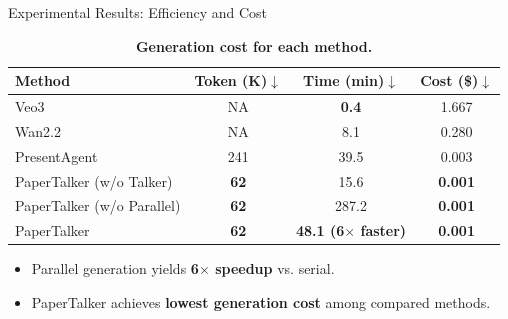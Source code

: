 \documentclass{beamer}
\newcommand{\alertterm}[1]{\alert{\textbf{#1}}}
\begin{document}
\begin{frame}{Experimental Results: Efficiency and Cost}
\begin{table}[ht]
  \centering
  \small
  \caption{\textbf{Generation cost for each method.}}
  \label{table:cost}
  \setlength{\tabcolsep}{6pt}
  \begin{tabular}{lccc}
    \toprule
    Method & Token (K)$\downarrow$ & Time (min)$\downarrow$ & Cost (\$)$\downarrow$ \\
    \midrule
    Veo3~\cite{deepmind2025veo3} & NA & \textbf{0.4} & 1.667 \\
    Wan2.2~\cite{wan} & NA & 8.1 & 0.280 \\
    \midrule
    PresentAgent~\cite{shi2025presentagent} & 241 & 39.5 & 0.003 \\
    PaperTalker (w/o Talker) & \textbf{62} & 15.6 & \textbf{0.001} \\
    PaperTalker (w/o Parallel) & \textbf{62} & 287.2 & \textbf{0.001} \\
    PaperTalker & \textbf{62} & \textbf{48.1 (6$\times$ faster)} & \textbf{0.001} \\
    \bottomrule
  \end{tabular}
\end{table}
\vspace{-1em}
\begin{itemize}
  \item Parallel generation yields \alertterm{6$\times$ speedup} vs. serial.
  \item PaperTalker achieves \alertterm{lowest generation cost} among compared methods.
\end{itemize}
\end{frame}
\end{document}
